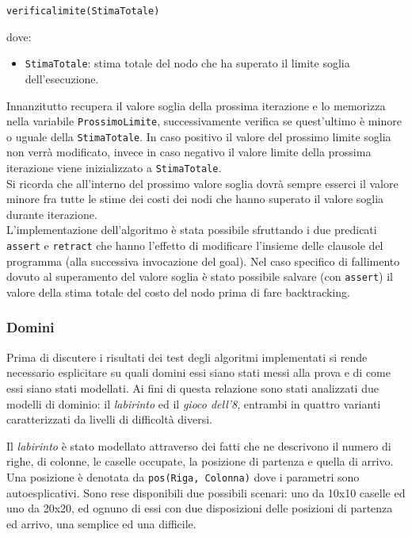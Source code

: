 \documentclass[a4paper,oneside,12pt]{book}
\def \code#1{\texttt{#1}}
\begin{document}
    \begin{center}

        \code{verifica\textunderscore limite(StimaTotale)}
    \end{center}
    dove:
    \begin{itemize}
        \item \code{StimaTotale}: stima totale del nodo che ha superato il limite soglia dell'esecuzione.
    \end{itemize}
    Innanzitutto recupera il valore soglia della prossima iterazione e lo memorizza nella variabile \code{ProssimoLimite}, successivamente verifica se quest'ultimo è minore o uguale della \code{StimaTotale}. In caso positivo il valore del prossimo limite soglia non verrà modificato, invece in caso negativo il valore limite della prossima iterazione viene inizializzato a \code{StimaTotale}. \\
    Si ricorda che all'interno del prossimo valore soglia dovrà sempre esserci il valore minore fra tutte le stime dei costi dei nodi che hanno superato il valore soglia durante iterazione. \\
    L'implementazione dell'algoritmo è stata possibile sfruttando i due predicati \code{assert} e \code{retract} che hanno l'effetto di modificare l'insieme delle clausole del programma (alla successiva invocazione del goal). Nel caso specifico di fallimento dovuto al superamento del valore soglia è stato possibile salvare (con \code{assert}) il valore della stima totale del costo del nodo prima di fare backtracking.

    \subsubsection{Domini}
    Prima di discutere i risultati dei test degli algoritmi implementati si rende necessario esplicitare su quali domini essi siano stati messi alla prova e di come essi siano stati modellati. Ai fini di questa relazione sono stati analizzati due modelli di dominio: il \textit{labirinto} ed il \textit{gioco dell’8}, entrambi in quattro varianti caratterizzati da livelli di difficoltà diversi.

    Il \textit{labirinto} è stato modellato attraverso dei fatti che ne descrivono il numero di righe, di colonne, le caselle occupate, la posizione di partenza e quella di arrivo. Una posizione è denotata da \code{pos(Riga, Colonna)} dove i parametri sono autoesplicativi. Sono rese disponibili due possibili scenari: uno da 10x10 caselle ed uno da 20x20, ed ognuno di essi con due disposizioni delle posizioni di partenza ed arrivo, una semplice ed una difficile.
\end{document}
